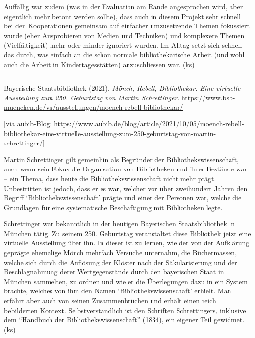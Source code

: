 \documentclass[a4paper,
fontsize=11pt,
oneside,
numbers=noperiodatend,
parskip=half-,
bibliography=totoc,
final
]{scrartcl}
\begin{document}
Auffällig war zudem (was in der Evaluation am Rande angesprochen wird,
aber eigentlich mehr betont werden sollte), dass auch in diesem Projekt
sehr schnell bei den Kooperationen gemeinsam auf einfacher umzusetzende
Themen fokussiert wurde (eher Ausprobieren von Medien und Techniken) und
komplexere Themen (Vielfältigkeit) mehr oder minder ignoriert wurden. Im
Alltag setzt sich schnell das durch, was einfach an die schon normale
bibliothekarische Arbeit (und wohl auch die Arbeit in
Kindertagesstätten) anzuschliessen war. (ks)

\begin{center}\rule{0.5\linewidth}{0.5pt}\end{center}

Bayerische Staatsbibliothek (2021). \emph{Mönch, Rebell, Bibliothekar.
Eine virtuelle Ausstellung zum 250. Geburtstag von Martin Schrettinger}.
\url{https://www.bsb-muenchen.de/va/ausstellungen/moench-rebell-bibliothekar/}

{[}via aubib-Blog:
\url{https://www.aubib.de/blog/article/2021/10/05/moench-rebell-bibliothekar-eine-virtuelle-ausstellung-zum-250-geburtstag-von-martin-schrettinger/}{]}

Martin Schrettinger gilt gemeinhin als Begründer der
Bibliothekswissenschaft, auch wenn sein Fokus die Organisation von
Bibliotheken und ihrer Bestände war -- ein Thema, dass heute die
Bibliothekswissenschaft nicht mehr prägt. Unbestritten ist jedoch, dass
er es war, welcher vor über zweihundert Jahren den Begriff
\enquote*{Bibliothekswissenschaft} prägte und einer der Personen war,
welche die Grundlagen für eine systematische Beschäftigung mit
Bibliotheken legte.

Schrettinger war bekanntlich in der heutigen Bayerischen
Staatsbibliothek in München tätig. Zu seinem 250. Geburtstag
veranstaltet diese Bibliothek jetzt eine virtuelle Ausstellung über ihn.
In dieser ist zu lernen, wie der von der Aufklärung geprägte ehemalige
Mönch mehrfach Versuche unternahm, die Büchermassen, welche sich durch
die Auflösung der Klöster nach der Säkularisierung und der
Beschlagnahmung derer Wertgegenstände durch den bayerischen Staat in
München sammelten, zu ordnen und wie er die Überlegungen dazu in ein
System brachte, welches von ihm den Namen
\enquote*{Bibliothekswissenschaft} erhielt. Man erfährt aber auch von
seinen Zusammenbrüchen und erhält einen reich bebilderten Kontext.
Selbstverständlich ist den Schriften Schrettingers, inklusive dem
\enquote{Handbuch der Bibliothekswissenschaft} (1834), ein eigener Teil
gewidmet. (ks)
\end{document}

